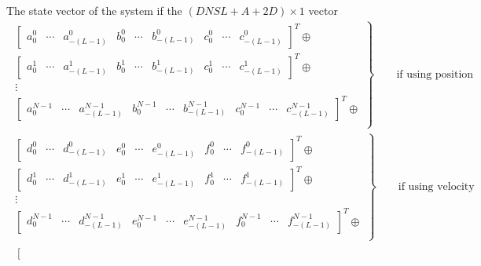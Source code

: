 \documentclass[]{article}
\begin{document}
The state vector of the system if the $(DNSL + A + 2D) \times 1$ vector
\begin{align*}
\left.\begin{aligned} %
\left[
\begin{array}{ccccccccc}
a_0^0 & \cdots & a_{-(L-1)}^0 &
b_0^0 & \cdots & b_{-(L-1)}^0 &
c_0^0 & \cdots & c_{-(L-1)}^0
\end{array}
\right]^T \oplus \\
\left[
\begin{array}{ccccccccc}
a_0^1 & \cdots & a_{-(L-1)}^1 &
b_0^1 & \cdots & b_{-(L-1)}^1 &
c_0^1 & \cdots & c_{-(L-1)}^1
\end{array}
\right]^T \oplus \\
\vdots \\
\left[
\begin{array}{ccccccccc}
a_0^{N-1} & \cdots & a_{-(L-1)}^{N-1} &
b_0^{N-1} & \cdots & b_{-(L-1)}^{N-1} &
c_0^{N-1} & \cdots & c_{-(L-1)}^{N-1}
\end{array}
\right]^T \oplus \\
\end{aligned}
\right\}
\qquad \text{if using position} \\
\left.\begin{aligned} %
\left[
\begin{array}{ccccccccc}
d_0^0 & \cdots & d_{-(L-1)}^0 &
e_0^0 & \cdots & e_{-(L-1)}^0 &
f_0^0 & \cdots & f_{-(L-1)}^0
\end{array}
\right]^T \oplus \\
\left[
\begin{array}{ccccccccc}
d_0^1 & \cdots & d_{-(L-1)}^1 &
e_0^1 & \cdots & e_{-(L-1)}^1 &
f_0^1 & \cdots & f_{-(L-1)}^1
\end{array}
\right]^T \oplus \\
\vdots \\
\left[
\begin{array}{ccccccccc}
d_0^{N-1} & \cdots & d_{-(L-1)}^{N-1} &
e_0^{N-1} & \cdots & e_{-(L-1)}^{N-1} &
f_0^{N-1} & \cdots & f_{-(L-1)}^{N-1}
\end{array}
\right]^T \oplus \\
\end{aligned}
\right\}
\qquad \text{if using velocity} \\
\left.\begin{aligned} %
\left[
\begin{array}{ccccccccc}

\end{array}
\end{aligned}
\end{align*}
\end{document}
